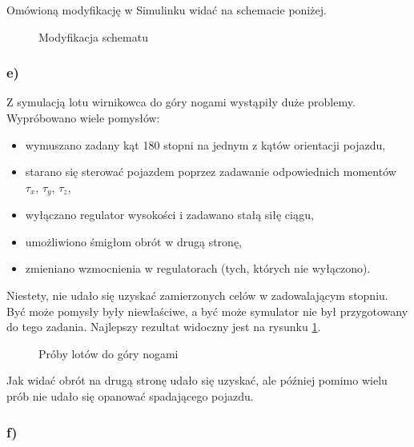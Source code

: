 \documentclass[11pt, a4paper]{article}
\begin{document}
Omówioną modyfikację w Simulinku widać na schemacie poniżej.
\begin{figure}[htbp!]
	\centering
	\caption{Modyfikacja schematu}
\end{figure}

\subsubsection*{e)}

Z symulacją lotu wirnikowca do góry nogami wystąpiły duże problemy. Wypróbowano wiele pomysłów:
\begin{itemize}
\item wymuszano zadany kąt 180 stopni na jednym z kątów orientacji pojazdu,
\item starano się sterować pojazdem poprzez zadawanie odpowiednich momentów $\tau_x$, $\tau_y$, $\tau_z$,
\item wyłączano regulator wysokości i zadawano stałą siłę ciągu,
\item umożliwiono śmigłom obrót w drugą stronę,
\item zmieniano wzmocnienia w regulatorach (tych, których nie wyłączono).
\end{itemize}

Niestety, nie udało się uzyskać zamierzonych celów w zadowalającym stopniu. Być może pomysły były niewłaściwe, a być może symulator nie był przygotowany do tego zadania.
Najlepszy rezultat widoczny jest na rysunku \ref{fig:mobile16e}.
\begin{figure}[htbp!]
	\centering
	
	\hfill%
	
	\caption{Próby lotów do góry nogami \label{fig:mobile16e}}
\end{figure}

Jak widać obrót na drugą stronę udało się uzyskać, ale później pomimo wielu prób nie udało się opanować spadającego pojazdu.

\subsubsection*{f)}
\end{document}
